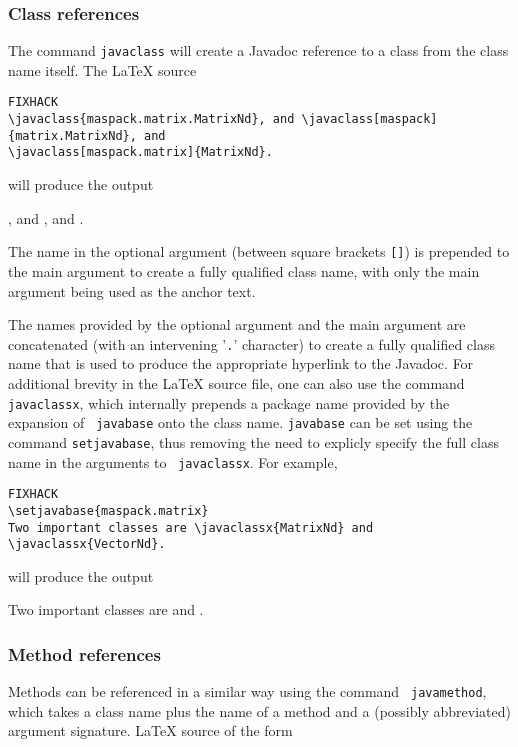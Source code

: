 \documentclass{article}
\begin{document}
\subsubsection{Class references}
\label{ClassRefsSec}

The command {\tt \BKS javaclass} will create a Javadoc reference to 
a class from the class name itself. The LaTeX source

\begin{lstlisting}FIXHACK
\javaclass{maspack.matrix.MatrixNd}, and \javaclass[maspack]{matrix.MatrixNd}, and
\javaclass[maspack.matrix]{MatrixNd}.
\end{lstlisting}

will produce the output

, and , and
.

The name in the optional argument (between square brackets {\tt []})
is prepended to the main argument to create a fully qualified class name,
with only the main argument being used as the anchor text. 

The names provided by the optional argument and the main argument are
concatenated (with an intervening '{\tt .}' character) to create a
fully qualified class name that is used to produce the appropriate
hyperlink to the Javadoc. For additional brevity in the LaTeX source
file, one can also use the command {\tt \BKS javaclassx}, which
internally prepends a package name provided by the expansion of {\tt
\BKS javabase} onto the class name. {\tt \BKS javabase} can be set
using the command {\tt \BKS setjavabase}, thus removing the need to
explicly specify the full class name in the arguments to {\tt \BKS
javaclassx}. For example,

\begin{lstlisting}FIXHACK
\setjavabase{maspack.matrix}
Two important classes are \javaclassx{MatrixNd} and \javaclassx{VectorNd}.
\end{lstlisting}

will produce the output

Two important classes are  and .

\subsubsection{Method references}

Methods can be referenced in a similar way using the command {\tt
\BKS javamethod}, which takes a class name plus the name of a method and
a (possibly abbreviated) argument signature.
LaTeX source of the form
\end{document}
